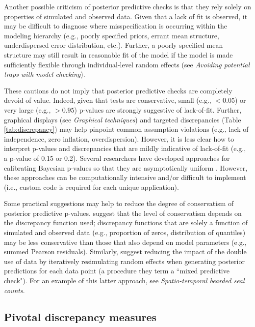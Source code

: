 \documentclass[12pt,english]{article}
\begin{document}
\begin{spacing}{1.9}
Another possible criticism of posterior predictive checks is that they rely solely on properties of simulated and observed data.  Given that a lack of fit is observed, it may be difficult to diagnose where misspecification is occurring within the modeling hierarchy (e.g., poorly specified priors, errant mean structure, underdispersed error distribution, etc.).  Further, a poorly specified mean structure may still result in reasonable fit of the model if the model is made sufficiently flexible through individual-level random effects (see \textit{Avoiding potential traps with model checking}).

These cautions do not imply that posterior predictive checks are completely devoid of value.  Indeed, given that tests are conservative, small (e.g., $<0.05$) or very large (e.g., $>0.95$) p-values are strongly suggestive of lack-of-fit.  Further, graphical displays (see \textit{Graphical techniques}) and targeted discrepancies (Table \ref{tab:discrepancy}) may help pinpoint common assumption violations (e.g., lack of independence, zero inflation, overdispersion).  However, it is less clear how to interpret p-values and discrepancies that are mildly indicative of lack-of-fit (e.g., a p-value of 0.15 or 0.2).
Several researchers have developed approaches for calibrating Bayesian p-values so that they are asymptotically uniform \citep[e.g.,][]{DeyEtAl1998,BayarriBerger1999}. However, these approaches can be computationally intensive and/or difficult to implement (i.e., custom code is required for each unique application).

Some practical suggestions may help to reduce the degree of conservatism of posterior predictive p-values.  \citet{LunnEtAl2013} suggest that the level of conservatism depends on the discrepancy function used; discrepancy functions that are solely a function of simulated and observed data (e.g., proportion of zeros, distribution of quantiles) may be less conservative than those that also depend on model parameters (e.g., summed Pearson residuals).  Similarly, \citet{MarshallSpiegelhalter2003} suggest reducing the impact of the double use of data by iteratively resimulating random effects when generating posterior predictions for each data point (a procedure they term a ``mixed predictive check").  For an example of this latter approach, see \textit{Spatio-temporal bearded seal counts}.



\subsection{Pivotal discrepancy measures}


\end{spacing}
\end{document}
